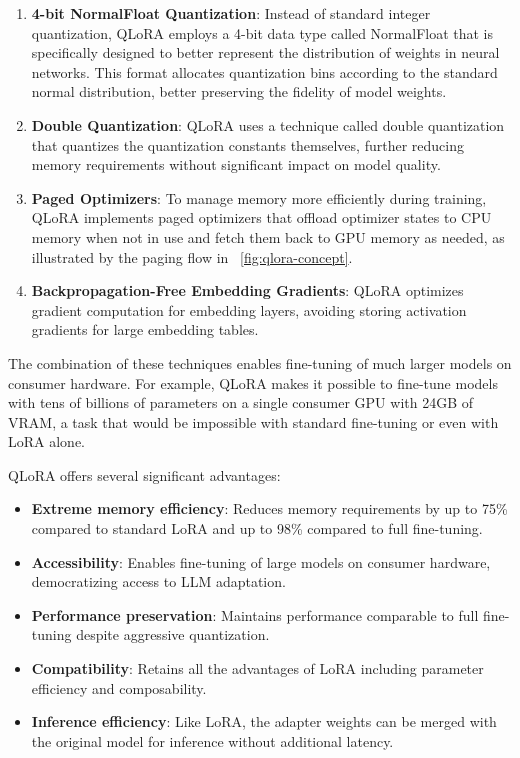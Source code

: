 \begin{enumerate}
    \item \textbf{4-bit NormalFloat Quantization}: Instead of standard integer quantization, QLoRA employs a 4-bit data type called NormalFloat that is specifically designed to better represent the distribution of weights in neural networks. This format allocates quantization bins according to the standard normal distribution, better preserving the fidelity of model weights.
    
    \item \textbf{Double Quantization}: QLoRA uses a technique called double quantization that quantizes the quantization constants themselves, further reducing memory requirements without significant impact on model quality.
    
    \item \textbf{Paged Optimizers}: To manage memory more efficiently during training, QLoRA implements paged optimizers that offload optimizer states to CPU memory when not in use and fetch them back to GPU memory as needed, as illustrated by the paging flow in \pic~\ref{fig:qlora-concept}.
    
    \item \textbf{Backpropagation-Free Embedding Gradients}: QLoRA optimizes gradient computation for embedding layers, avoiding storing activation gradients for large embedding tables.
\end{enumerate}

The combination of these techniques enables fine-tuning of much larger models on consumer hardware. For example, QLoRA makes it possible to fine-tune models with tens of billions of parameters on a single consumer GPU with 24GB of VRAM, a task that would be impossible with standard fine-tuning or even with LoRA alone.

QLoRA offers several significant advantages:

\begin{itemize}
    \item \textbf{Extreme memory efficiency}: Reduces memory requirements by up to 75\% compared to standard LoRA and up to 98\% compared to full fine-tuning.
    \item \textbf{Accessibility}: Enables fine-tuning of large models on consumer hardware, democratizing access to LLM adaptation.
    \item \textbf{Performance preservation}: Maintains performance comparable to full fine-tuning despite aggressive quantization.
    \item \textbf{Compatibility}: Retains all the advantages of LoRA including parameter efficiency and composability.
    \item \textbf{Inference efficiency}: Like LoRA, the adapter weights can be merged with the original model for inference without additional latency.
\end{itemize}

